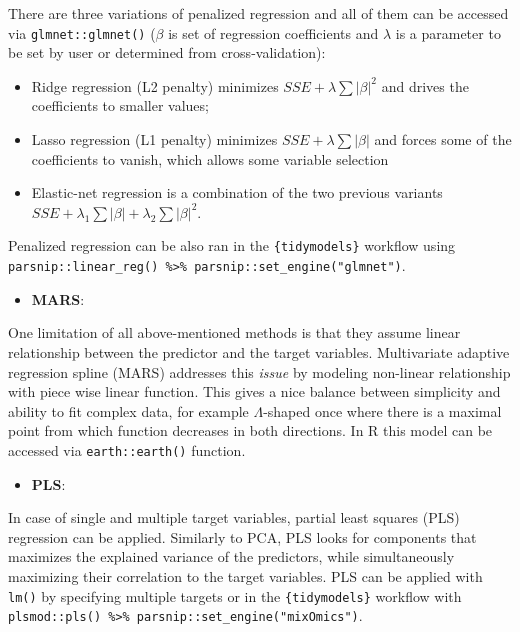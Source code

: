 \documentclass[
]{krantz}
\providecommand{\tightlist}{%
  \setlength{\itemsep}{0pt}\setlength{\parskip}{0pt}}
\begin{document}
There are three variations of penalized regression and all of them can be accessed via \texttt{glmnet::glmnet()} (\(\beta\) is set of regression coefficients and \(\lambda\) is a parameter to be set by user or determined from cross-validation):

\begin{itemize}
\tightlist
\item
  Ridge regression (L2 penalty) minimizes \(SSE + \lambda \sum|\beta|^2\) and drives the coefficients to smaller values;
\item
  Lasso regression (L1 penalty) minimizes \(SSE + \lambda \sum|\beta|\) and forces some of the coefficients to vanish, which allows some variable selection
\item
  Elastic-net regression is a combination of the two previous variants \(SSE + \lambda_1 \sum|\beta| + \lambda_2 \sum|\beta|^2\).
\end{itemize}

Penalized regression can be also ran in the \texttt{\{tidymodels\}} workflow using \texttt{parsnip::linear\_reg()\ \%\textgreater{}\%\ parsnip::set\_engine("glmnet")}.

\begin{itemize}
\tightlist
\item
  \textbf{MARS}:
\end{itemize}

One limitation of all above-mentioned methods is that they assume linear relationship between the predictor and the target variables. Multivariate adaptive regression spline (MARS) addresses this \emph{issue} by modeling non-linear relationship with piece wise linear function. This gives a nice balance between simplicity and ability to fit complex data, for example \(\Lambda\)-shaped once where there is a maximal point from which function decreases in both directions. In R this model can be accessed via \texttt{earth::earth()} function.

\begin{itemize}
\tightlist
\item
  \textbf{PLS}:
\end{itemize}

In case of single and multiple target variables, partial least squares (PLS) regression can be applied. Similarly to PCA, PLS looks for components that maximizes the explained variance of the predictors, while simultaneously maximizing their correlation to the target variables. PLS can be applied with \texttt{lm()} by specifying multiple targets or in the \texttt{\{tidymodels\}} workflow with \texttt{plsmod::pls()\ \%\textgreater{}\%\ parsnip::set\_engine("mixOmics")}.
\end{document}
